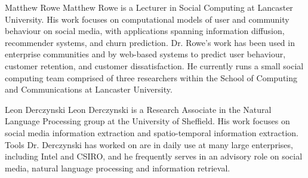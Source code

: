 \documentclass[10pt,journal,compsoc]{IEEEtran}
\begin{document}
\begin{IEEEbiography}{Matthew Rowe}
Matthew Rowe is  a Lecturer in Social Computing at Lancaster University.
His work focuses on computational models of user and community behaviour on social media, with applications spanning information diffusion, recommender systems, and churn prediction.
Dr. Rowe's work has been used in enterprise communities and by web-based systems to predict user behaviour, customer retention, and customer dissatisfaction.
He currently runs a small social computing team comprised of three researchers within the School of Computing and Communications at Lancaster University.
\end{IEEEbiography}

\begin{IEEEbiography}{Leon Derczynski}
Leon Derczynski is a Research Associate in the Natural Language Processing group at the University of Sheffield.
His work focuses on social media information extraction and spatio-temporal information extraction.
Tools Dr. Derczynski has worked on are in daily use at many large enterprises, including Intel and CSIRO, and he frequently serves in an advisory role on social media, natural language processing and information retrieval.
\end{IEEEbiography}
\end{document}
